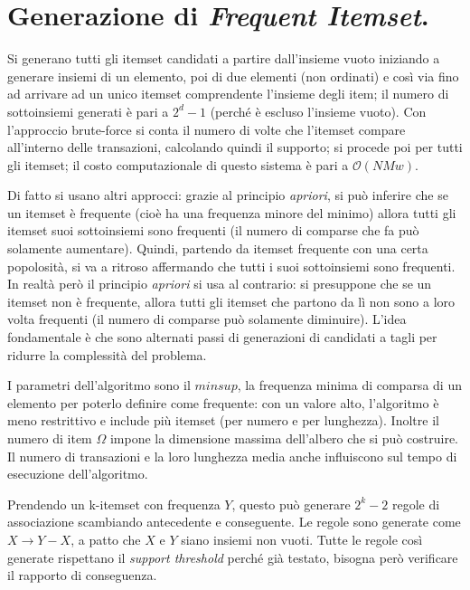 \documentclass[11pt, a4page, twocolumn]{article}
\begin{document}
\section{Generazione di \textit{Frequent Itemset}.}
Si generano tutti gli itemset candidati a partire dall'insieme vuoto iniziando a generare insiemi di un elemento, poi di due elementi (non ordinati) e così via fino ad arrivare ad un unico itemset comprendente l'insieme degli item; il numero di sottoinsiemi generati è pari a $2^d - 1$ (perché è escluso l'insieme vuoto).
Con l'approccio brute-force si conta il numero di volte che l'itemset compare all'interno delle transazioni, calcolando quindi il supporto; si procede poi per tutti gli itemset; il costo computazionale di questo sistema è pari a $\mathcal{O}(NMw)$. \newline

Di fatto si usano altri approcci: grazie al principio \textit{apriori}, si può inferire che se un itemset è frequente (cioè ha una frequenza minore del minimo) allora tutti gli itemset suoi sottoinsiemi sono frequenti (il numero di comparse che fa può solamente aumentare).
Quindi, partendo da itemset frequente con una certa popolosità, si va a ritroso affermando che tutti i suoi sottoinsiemi sono frequenti.
In realtà però il principio \textit{apriori} si usa al contrario: si presuppone che se un itemset non è frequente, allora tutti gli itemset che partono da lì non sono a loro volta frequenti (il numero di comparse può solamente diminuire).
L'idea fondamentale è che sono alternati passi di generazioni di candidati a tagli per ridurre la complessità del problema.

I parametri dell'algoritmo sono il $minsup$, la frequenza minima di comparsa di un elemento per poterlo definire come frequente: con un valore alto, l'algoritmo è meno restrittivo e include più itemset (per numero e per lunghezza).
Inoltre il numero di item $\Omega$ impone la dimensione massima dell'albero che si può costruire.
Il numero di transazioni e la loro lunghezza media anche influiscono sul tempo di esecuzione dell'algoritmo.

Prendendo un k-itemset con frequenza $Y$, questo può generare $2^k - 2$ regole di associazione scambiando antecedente e conseguente.
Le regole sono generate come $X \rightarrow Y - X$, a patto che $X$ e $Y$ siano insiemi non vuoti.
Tutte le regole così generate rispettano il \textit{support threshold} perché già testato, bisogna però verificare il rapporto di conseguenza.
\end{document}
